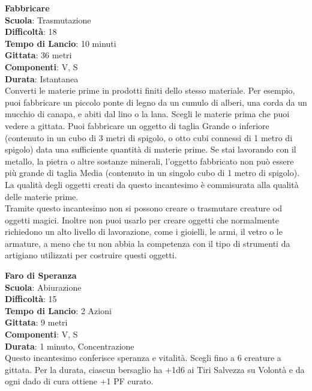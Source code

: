 \begin{multicols}{2}
\medskip\textbf{Fabbricare}\\
\textbf{Scuola}: Trasmutazione\\
\textbf{Difficoltà}: 18\\
\textbf{Tempo di Lancio}: 10 minuti\\
\textbf{Gittata}: 36 metri\\
\textbf{Componenti}: V, S\\
\textbf{Durata}: Istantanea\\
Converti le materie prime in prodotti finiti dello stesso materiale. Per esempio, puoi fabbricare un piccolo ponte di legno da un cumulo di alberi, una corda da un mucchio di canapa, e abiti dal lino o la lana. Scegli le materie prima che puoi vedere a gittata. Puoi fabbricare un oggetto di taglia Grande o inferiore (contenuto in un cubo di 3 metri di spigolo, o otto cubi connessi di 1 metro di spigolo) data una sufficiente quantità di materie prime. Se stai lavorando con il metallo, la pietra o altre sostanze minerali, l'oggetto fabbricato non può essere più grande di taglia Media (contenuto in un singolo cubo di 1 metro di spigolo). La qualità degli oggetti creati da questo incantesimo è commisurata alla qualità delle materie prime.\\
Tramite questo incantesimo non si possono creare o trasmutare creature od oggetti magici. Inoltre non puoi usarlo per creare oggetti che normalmente richiedono un alto livello di lavorazione, come i gioielli, le armi, il vetro o le armature, a meno che tu non abbia la competenza con il tipo di strumenti da artigiano utilizzati per costruire questi oggetti.

\medskip\textbf{Faro di Speranza}\\
\textbf{Scuola}: Abiurazione\\
\textbf{Difficoltà}: 15\\
\textbf{Tempo di Lancio}: 2 Azioni\\
\textbf{Gittata}: 9 metri\\
\textbf{Componenti}: V, S\\
\textbf{Durata}: 1 minuto, Concentrazione\\
Questo incantesimo conferisce speranza e vitalità. Scegli fino a 6 creature a gittata. Per la durata, ciascun bersaglio ha +1d6 ai Tiri Salvezza su Volontà e da ogni dado di cura ottiene +1 PF curato.


\end{multicols}
